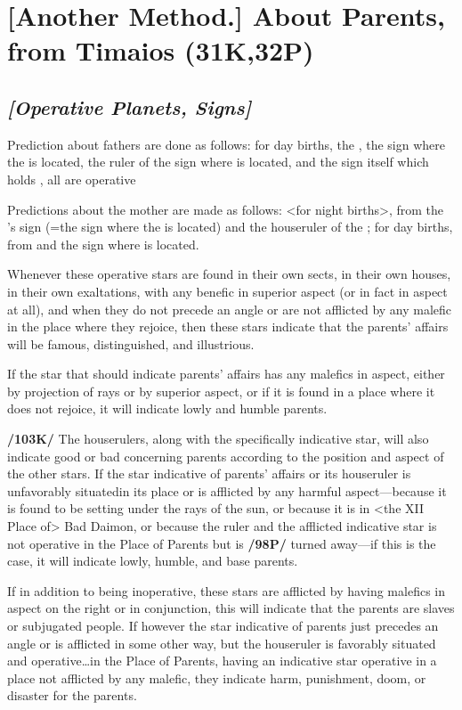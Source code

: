 \section{[Another Method.] About Parents, from Timaios (31K,32P)}

\subsection{\textit{[Operative Planets, Signs]}}
Prediction about fathers are done as follows: for day births, the \Sun, the sign where the \Sun\xspace is located, the ruler of the sign where \Jupiter\xspace is located, and the sign itself which holds \Jupiter, all are operative

Predictions about the mother are made as follows: <for night births>, from the \Moon’s sign (=the sign where the \Moon\xspace is located) and the houseruler of the \Moon; for day births, from \Venus\xspace and the sign where \Venus\xspace is located. 

Whenever these operative stars are found in their own sects, in their own houses, in their own exaltations, with any benefic in superior aspect (or in fact in aspect at all), and when they do not precede an angle or are not afflicted by any malefic in the place where they rejoice, then these stars indicate that the parents’ affairs will be famous, distinguished, and illustrious. 

If the star that should indicate parents’ affairs has any malefics in aspect, either by projection of rays or by superior aspect, or if it is found in a place where it does not rejoice, it will indicate lowly and humble parents.

\textbf{/103K/} The houserulers, along with the specifically indicative star, will also indicate good or bad concerning parents according to the position and aspect of the other stars. If the star indicative of parents’ affairs or its houseruler is unfavorably situated\mndl in its place or is afflicted by any harmful aspect—because it is found to be setting under the rays of the sun, or because it is in <the XII Place of> Bad Daimon, or because the ruler and the afflicted indicative star is not operative in the Place of Parents but is \textbf{/98P/} turned away—if this is the case, it will indicate lowly, humble, and base parents. 

If in addition to being inoperative, these stars are afflicted by having malefics in aspect on the right or in conjunction, this will indicate that the parents are slaves or subjugated people. If however the star indicative of parents just precedes an angle or is afflicted in some other way, but the houseruler is favorably situated and operative\ldots in the Place of Parents, having an indicative star operative in a place not afflicted by any malefic, they indicate harm, punishment, doom, or disaster for the parents. 

